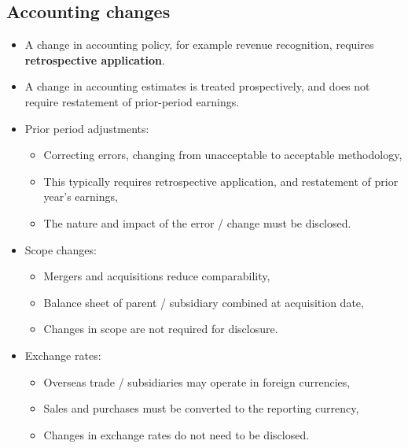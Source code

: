 \documentclass[../notes_compiled.tex]{subfiles}
\begin{document}
\subsection{Accounting changes}
\begin{itemize}
\item A change in accounting policy, for example revenue recognition, requires \textbf{retrospective application}.
\item A change in accounting estimates is treated prospectively, and does not require restatement of prior-period earnings.
\item Prior period adjustments:
\begin{itemize}
\item Correcting errors, changing from unacceptable to acceptable methodology,
\item This typically requires retrospective application, and restatement of prior year's earnings,
\item The nature and impact of the error / change must be disclosed.
\end{itemize}
\item Scope changes:
\begin{itemize}
\item Mergers and acquisitions reduce comparability,
\item Balance sheet of parent / subsidiary combined at acquisition date,
\item Changes in scope are not required for disclosure.
\end{itemize}
\item Exchange rates:
\begin{itemize}
\item Overseas trade / subsidiaries may operate in foreign currencies,
\item Sales and purchases must be converted to the reporting currency,
\item Changes in exchange rates do not need to be disclosed.
\end{itemize}
\end{itemize}
\end{document}
